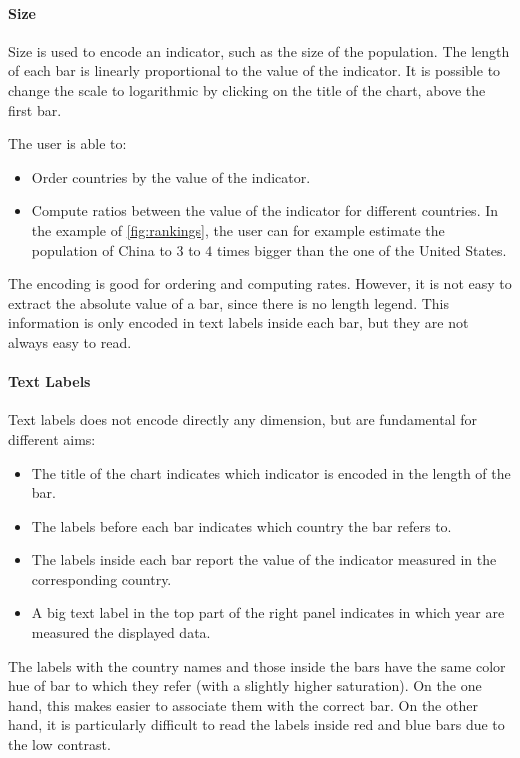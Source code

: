 \paragraph{Size}
Size is used to encode an indicator, such as the size of the population.
The length of each bar is linearly proportional to the value of the indicator.
It is possible to change the scale to logarithmic by clicking on the title of the chart, above the first bar.

The user is able to:
\begin{itemize}
	\item Order countries by the value of the indicator.
	\item Compute ratios between the value of the indicator for different countries. In the example of \cref{fig:rankings}, the user can for example estimate the population of China to $3$ to $4$ times bigger than the one of the United States.
\end{itemize}

The encoding is good for ordering and computing rates.
However, it is not easy to extract the absolute value of a bar, since there is no length legend.
This information is only encoded in text labels inside each bar, but they are not always easy to read.

\paragraph{Text Labels}
Text labels does not encode directly any dimension, but are fundamental for different aims:
\begin{itemize}
	\item The title of the chart indicates which indicator is encoded in the length of the bar.
	\item The labels before each bar indicates which country the bar refers to.
	\item The labels inside each bar report the value of the indicator measured in the corresponding country.
	\item A big text label in the top part of the right panel indicates in which year are measured the displayed data.
\end{itemize}

The labels with the country names and those inside the bars have the same color hue of bar to which they refer (with a slightly higher saturation).
On the one hand, this makes easier to associate them with the correct bar.
On the other hand, it is particularly difficult to read the labels inside red and blue bars due to the low contrast.

